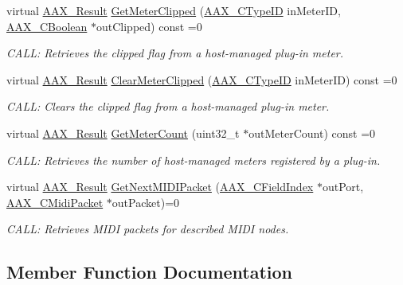 \begin{DoxyCompactItemize}
virtual \mbox{\hyperlink{a00392_a4d8f69a697df7f70c3a8e9b8ee130d2f}{A\+A\+X\+\_\+\+Result}} \mbox{\hyperlink{a01637_a69fa28a0887223cce230d8380945ecb5}{Get\+Meter\+Clipped}} (\mbox{\hyperlink{a00392_ac678f9c1fbcc26315d209f71a147a175}{A\+A\+X\+\_\+\+C\+Type\+ID}} in\+Meter\+ID, \mbox{\hyperlink{a00392_aa216506530f1d19a2965931ced2b274b}{A\+A\+X\+\_\+\+C\+Boolean}} $\ast$out\+Clipped) const =0
\begin{DoxyCompactList}\small\item\em C\+A\+LL\+: Retrieves the clipped flag from a host-\/managed plug-\/in meter. \end{DoxyCompactList}\item 
virtual \mbox{\hyperlink{a00392_a4d8f69a697df7f70c3a8e9b8ee130d2f}{A\+A\+X\+\_\+\+Result}} \mbox{\hyperlink{a01637_a93d824d7415416028b2a7d5561deab58}{Clear\+Meter\+Clipped}} (\mbox{\hyperlink{a00392_ac678f9c1fbcc26315d209f71a147a175}{A\+A\+X\+\_\+\+C\+Type\+ID}} in\+Meter\+ID) const =0
\begin{DoxyCompactList}\small\item\em C\+A\+LL\+: Clears the clipped flag from a host-\/managed plug-\/in meter. \end{DoxyCompactList}\item 
virtual \mbox{\hyperlink{a00392_a4d8f69a697df7f70c3a8e9b8ee130d2f}{A\+A\+X\+\_\+\+Result}} \mbox{\hyperlink{a01637_aaf316786f9f280cd5711848eeeec3d99}{Get\+Meter\+Count}} (uint32\+\_\+t $\ast$out\+Meter\+Count) const =0
\begin{DoxyCompactList}\small\item\em C\+A\+LL\+: Retrieves the number of host-\/managed meters registered by a plug-\/in. \end{DoxyCompactList}\item 
virtual \mbox{\hyperlink{a00392_a4d8f69a697df7f70c3a8e9b8ee130d2f}{A\+A\+X\+\_\+\+Result}} \mbox{\hyperlink{a01637_a6a5c0cdfbe314476bdfd15caaee8d010}{Get\+Next\+M\+I\+D\+I\+Packet}} (\mbox{\hyperlink{a00392_ae807f8986143820cfb5d6da32165c9c7}{A\+A\+X\+\_\+\+C\+Field\+Index}} $\ast$out\+Port, \mbox{\hyperlink{a01429}{A\+A\+X\+\_\+\+C\+Midi\+Packet}} $\ast$out\+Packet)=0
\begin{DoxyCompactList}\small\item\em C\+A\+LL\+: Retrieves M\+I\+DI packets for described M\+I\+DI nodes. \end{DoxyCompactList}\end{DoxyCompactItemize}


\subsection{Member Function Documentation}
\mbox{\label{a01637_ae1ccab17cf8b38ab415a7f097cb7d683}} 
